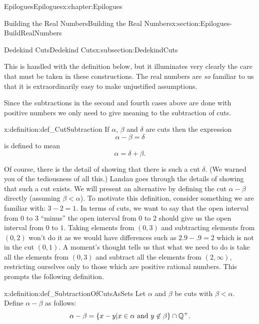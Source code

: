 \begin{chapterptx}{Epilogues}{}{Epilogues}{}{}{x:chapter:Epilogues}
\begin{sectionptx}{Building the Real Numbers}{}{Building the Real Numbers}{}{}{x:section:Epilogues-BuildRealNumbers}
\begin{subsectionptx}{Dedekind Cuts}{}{Dedekind Cuts}{}{}{x:subsection:DedekindCuts}
			\par
			This is handled with the definition below, but it illuminates very clearly the care that must be taken in these constructions. The real numbers are \emph{so} familiar to us that it is extraordinarily easy to make unjustified assumptions.%
			\par
			Since the subtractions in the second and fourth cases above are done with positive numbers we only need to give meaning to the subtraction of cuts.%
			\begin{definition}{}{x:definition:def_CutSubtraction}%
				 If \(\alpha\), \(\beta\) and \(\delta\) are cuts then the expression%
				\begin{equation*}
					\alpha-\beta=\delta
				\end{equation*}
				is defined to mean%
				\begin{equation*}
					\alpha=\delta+\beta\text{.}
				\end{equation*}
			\end{definition}
			Of course, there is the detail of showing that there is such a cut \(\delta\). (We warned you of the tediousness of all this.) Landau goes through the details of showing that such a cut exists. We will present an alternative by defining the cut \(\alpha-\beta\) directly (assuming \(\beta\lt \alpha\)). To motivate this definition, consider something we are familiar with: \(3-2=1\). In terms of cuts, we want to say that the open interval from \(0\) to \(3\) ``minus'' the open interval from \(0\) to \(2\) should give us the open interval from \(0\) to \(1\). Taking elements from \((0,3)\) and subtracting elements from \((0,2)\) won't do it as we would have differences such as \(2.9-.9=2\) which is not in the cut \((0,1)\). A moment's thought tells us that what we need to do is take all the elements from \((0,3)\) and subtract all the elements from \((2,\infty)\), restricting ourselves only to those which are positive rational numbers. This prompts the following definition.%
			\begin{definition}{}{x:definition:def_SubtractionOfCutsAsSets}%
				 Let \(\alpha\) and \(\beta\) be cuts with \(\beta\lt \alpha\). Define \(\alpha-\beta\) as follows:%
				\begin{equation*}
					\alpha-\beta =\left\{x-y|x\in\alpha \text{ and } y\not\in\beta\right\}\cap\mathbb {Q}^+\text{.}
				\end{equation*}
			\end{definition}

\end{subsectionptx}
\end{sectionptx}
\end{chapterptx}
